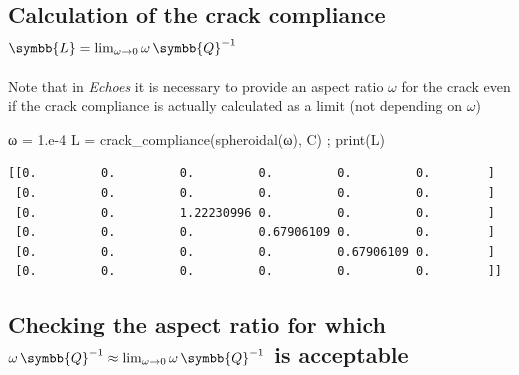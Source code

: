 \documentclass[
  letterpaper,
  DIV=11,
  numbers=noendperiod]{scrreprt}
\newenvironment{Shaded}{\begin{snugshade}}{\end{snugshade}}
\newcommand{\BuiltInTok}[1]{\textcolor[rgb]{0.00,0.23,0.31}{#1}}
\newcommand{\FloatTok}[1]{\textcolor[rgb]{0.68,0.00,0.00}{#1}}
\newcommand{\NormalTok}[1]{\textcolor[rgb]{0.00,0.23,0.31}{#1}}
\newcommand{\OperatorTok}[1]{\textcolor[rgb]{0.37,0.37,0.37}{#1}}
\newcommand{\uuuu}[1]{{\symbb{{#1}}}}
\begin{document}
\hypertarget{calculation-of-the-crack-compliance-uuuullim_omegato-0omegauuuuq-1}{%
\subsection{\texorpdfstring{Calculation of the crack compliance
\(\uuuu{L}=\lim_{\omega\to 0}\omega\,\uuuu{Q}^{-1}\)}{Calculation of the crack compliance \textbackslash uuuu\{L\}=\textbackslash lim\_\{\textbackslash omega\textbackslash to 0\}\textbackslash omega\textbackslash,\textbackslash uuuu\{Q\}\^{}\{-1\}}}\label{calculation-of-the-crack-compliance-uuuullim_omegato-0omegauuuuq-1}}

Note that in \emph{Echoes} it is necessary to provide an aspect ratio
\(\omega\) for the crack even if the crack compliance is actually
calculated as a limit (not depending on \(\omega\))

\begin{Shaded}
\begin{Highlighting}[]
\NormalTok{ω }\OperatorTok{=} \FloatTok{1.e{-}4}
\NormalTok{L }\OperatorTok{=}\NormalTok{ crack\_compliance(spheroidal(ω), C) }\OperatorTok{;} \BuiltInTok{print}\NormalTok{(L)}
\end{Highlighting}
\end{Shaded}

\begin{verbatim}
[[0.         0.         0.         0.         0.         0.        ]
 [0.         0.         0.         0.         0.         0.        ]
 [0.         0.         1.22230996 0.         0.         0.        ]
 [0.         0.         0.         0.67906109 0.         0.        ]
 [0.         0.         0.         0.         0.67906109 0.        ]
 [0.         0.         0.         0.         0.         0.        ]]
\end{verbatim}

\hypertarget{checking-the-aspect-ratio-for-which-omegauuuuq-1approx-lim_omegato-0omegauuuuq-1-is-acceptable}{%
\subsection{\texorpdfstring{Checking the aspect ratio for which
\(\omega\,\uuuu{Q}^{-1}\approx \lim_{\omega\to 0}\omega\,\uuuu{Q}^{-1}\)
is
acceptable}{Checking the aspect ratio for which \textbackslash omega\textbackslash,\textbackslash uuuu\{Q\}\^{}\{-1\}\textbackslash approx \textbackslash lim\_\{\textbackslash omega\textbackslash to 0\}\textbackslash omega\textbackslash,\textbackslash uuuu\{Q\}\^{}\{-1\} is acceptable}}\label{checking-the-aspect-ratio-for-which-omegauuuuq-1approx-lim_omegato-0omegauuuuq-1-is-acceptable}}
\end{document}
